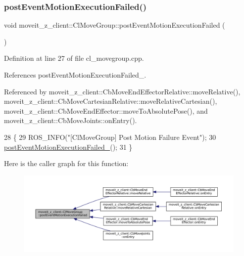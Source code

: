 \subsubsection{\texorpdfstring{post\+Event\+Motion\+Execution\+Failed()}{postEventMotionExecutionFailed()}}
{\footnotesize\ttfamily void moveit\+\_\+z\+\_\+client\+::\+Cl\+Move\+Group\+::post\+Event\+Motion\+Execution\+Failed (\begin{DoxyParamCaption}{ }\end{DoxyParamCaption})}



Definition at line 27 of file cl\+\_\+movegroup.\+cpp.



References post\+Event\+Motion\+Execution\+Failed\+\_\+.



Referenced by moveit\+\_\+z\+\_\+client\+::\+Cb\+Move\+End\+Effector\+Relative\+::move\+Relative(), moveit\+\_\+z\+\_\+client\+::\+Cb\+Move\+Cartesian\+Relative\+::move\+Relative\+Cartesian(), moveit\+\_\+z\+\_\+client\+::\+Cb\+Move\+End\+Effector\+::move\+To\+Absolute\+Pose(), and moveit\+\_\+z\+\_\+client\+::\+Cb\+Move\+Joints\+::on\+Entry().


\begin{DoxyCode}
28 \{
29     ROS\_INFO(\textcolor{stringliteral}{"[ClMoveGroup] Post Motion Failure Event"});
30     \hyperlink{classmoveit__z__client_1_1ClMoveGroup_afecfdc1860dffea3331379b90d608154}{postEventMotionExecutionFailed\_}();
31 \}
\end{DoxyCode}
Here is the caller graph for this function\+:
\nopagebreak
\begin{figure}[H]
\begin{center}
\leavevmode
\includegraphics[width=350pt]{classmoveit__z__client_1_1ClMoveGroup_a42bede73264ae2d5dfe0117315042acb_icgraph}
\end{center}
\end{figure}
\mbox{\label{classmoveit__z__client_1_1ClMoveGroup_ad6b8f0acbe3d11b5c39a83911a3d95b8}} 
